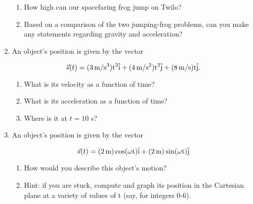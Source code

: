 \documentclass[12pt]{article}
\begin{document}
\begin{enumerate}
\begin{enumerate}
\item How high can our spacefaring frog jump on Twilo?
\item Based on a comparison of the two jumping-frog problems, can you make any statements regarding gravity and acceleration?
\end{enumerate}

\item An object's position is given by the vector 

$$\vec s(t) = (3\,\rm m/\rm s^3) t^3 \hat i + (4\, \rm m/\rm s^2) t^2 \hat j + (8\, \rm m/\rm s) t\hat j.$$

\begin{enumerate}
\item What is its velocity as a function of time?
\item What is its acceleration as a function of time?
\item Where is it at $t=10$ s?
\end{enumerate}

\item An object's position is given by the vector 

$$\vec s(t) = (2\, \rm m) \cos (\omega t) \hat i + (2\, \rm m) \sin (\omega t) \hat j$$

\begin{enumerate}
\item How would you describe this object's motion? 
\item Hint: if you are stuck, compute and graph its position in the Cartesian plane at a variety of values of t (say, for integers 0-6).
\end{enumerate}
\end{enumerate}
\end{document}
